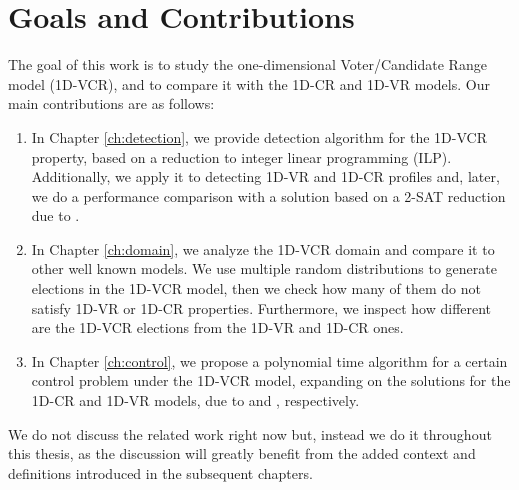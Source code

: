 
\section{Goals and Contributions}
The goal of this work is to study the one-dimensional Voter/Candidate Range model (1D-VCR),
and to compare it with the 1D-CR and 1D-VR models.
Our main contributions are as follows:
\begin{enumerate}
    \item In Chapter \ref{ch:detection}, we provide detection algorithm for the 1D-VCR property,
    based on a reduction to integer linear programming (ILP). 
    Additionally, we apply it to detecting 1D-VR and 1D-CR profiles and,
    later, we do a performance comparison with a solution based on a 2-SAT reduction due to \cite{fitzsimmons-lackner-sat-cop}. 

    \item In Chapter \ref{ch:domain}, we analyze the 1D-VCR domain and compare it to other well known models.
    We use multiple random distributions to generate elections in the 1D-VCR model, 
    then we check how many of them do not satisfy 1D-VR or 1D-CR properties.
    Furthermore, we inspect how different are the 1D-VCR elections from the 1D-VR and 1D-CR ones.
    
    \item In Chapter \ref{ch:control}, we propose a polynomial time algorithm for a certain control problem under the 1D-VCR model,
    expanding on the solutions for the 1D-CR and 1D-VR models,
    due to \cite{control-cr-how-hard-magiera-faliszewski} and \cite{control-sp-shield-faliszewski-hemaspaandra}, respectively.

\end{enumerate}

We do not discuss the related work right now but, instead we do it throughout this thesis,
as the discussion will greatly benefit from the added context and definitions introduced in the subsequent chapters.